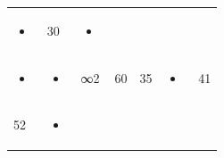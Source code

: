 \documentclass[
  11pt,
  a4paper]{book}
\begin{document}
\begin{longtable}[]{@{}lllllll@{}}
\begin{minipage}[t]{0.06\columnwidth}
\begin{itemize}
\item
\end{itemize}\strut
\end{minipage} & \begin{minipage}[t]{0.06\columnwidth}\raggedright
30\strut
\end{minipage} & \begin{minipage}[t]{0.06\columnwidth}\raggedright
\begin{itemize}
\item
\end{itemize}\strut
\end{minipage}\tabularnewline
\begin{minipage}[t]{0.06\columnwidth}\raggedright
\begin{itemize}
\item
\end{itemize}\strut
\end{minipage} & \begin{minipage}[t]{0.06\columnwidth}\raggedright
\begin{itemize}
\item
\end{itemize}\strut
\end{minipage} & \begin{minipage}[t]{0.06\columnwidth}\raggedright
∞2\strut
\end{minipage} & \begin{minipage}[t]{0.06\columnwidth}\raggedright
60\strut
\end{minipage} & \begin{minipage}[t]{0.06\columnwidth}\raggedright
35\strut
\end{minipage} & \begin{minipage}[t]{0.06\columnwidth}\raggedright
\begin{itemize}
\item
\end{itemize}\strut
\end{minipage} & \begin{minipage}[t]{0.06\columnwidth}\raggedright
41\strut
\end{minipage}\tabularnewline
\begin{minipage}[t]{0.06\columnwidth}\raggedright
52\strut
\end{minipage} & \begin{minipage}[t]{0.06\columnwidth}\raggedright
\begin{itemize}
\item
\end{itemize}\strut

\end{minipage}
\end{longtable}
\end{document}
